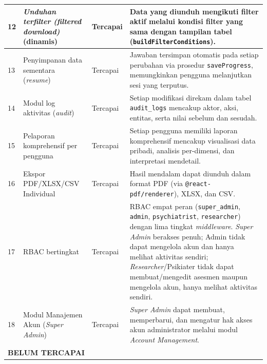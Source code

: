 {\begin{longtable}{|p{0.6cm}|p{4.0cm}|p{1.8cm}|p{5.8cm}|}
  \hline
  12 & \textit{Unduhan terfilter (\textit{filtered download})} (dinamis) & Tercapai & Data yang diunduh mengikuti filter aktif melalui kondisi filter yang sama dengan tampilan tabel (\texttt{buildFilterConditions}). \\
  \hline
  13 & Penyimpanan data sementara (\textit{resume}) & Tercapai & Jawaban tersimpan otomatis pada setiap perubahan via prosedur \texttt{saveProgress}, memungkinkan pengguna melanjutkan sesi yang terputus. \\
  \hline
  14 & Modul log aktivitas (\textit{audit}) & Tercapai & Setiap modifikasi direkam dalam tabel \texttt{audit\_logs} mencakup aktor, aksi, entitas, serta nilai sebelum dan sesudah. \\
  \hline
  15 & Pelaporan komprehensif per pengguna & Tercapai & Setiap pengguna memiliki laporan komprehensif mencakup visualisasi data pribadi, analisis per-dimensi, dan interpretasi mendetail. \\
  \hline
  16 & Ekspor PDF/XLSX/CSV Individual & Tercapai & Hasil mendalam dapat diunduh dalam format PDF (via \texttt{@react-pdf/renderer}), XLSX, dan CSV. \\
  \hline
  17 & RBAC bertingkat & Tercapai & RBAC empat peran (\texttt{super\_admin}, \texttt{admin}, \texttt{psychiatrist}, \texttt{researcher}) dengan lima tingkat \textit{middleware}. \textit{Super Admin} berakses penuh; Admin tidak dapat mengelola akun dan hanya melihat aktivitas sendiri; \textit{Researcher}/Psikiater tidak dapat membuat/mengedit asesmen maupun mengelola akun, hanya melihat aktivitas sendiri. \\
  \hline
  18 & Modul Manajemen Akun (\textit{Super Admin}) & Tercapai & \textit{Super Admin} dapat membuat, memperbarui, dan mengatur hak akses akun administrator melalui modul \textit{Account Management}. \\
  \hline

  \multicolumn{4}{|l|}{\textbf{BELUM TERCAPAI}} \\
  \hline


\end{longtable}}
